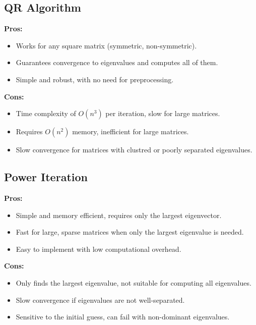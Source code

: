 \documentclass[journal]{IEEEtran}
\begin{document}
\subsection*{QR Algorithm}
\textbf{Pros:}
\begin{itemize}
    \item Works for any square matrix (symmetric, non-symmetric).
    \item Guarantees convergence to eigenvalues and computes all of them.
    \item Simple and robust, with no need for preprocessing.
\end{itemize}
\textbf{Cons:}
\begin{itemize}
    \item Time complexity of $O(n^3)$ per iteration, slow for large matrices.
    \item Requires $O(n^2)$ memory, inefficient for large matrices.
    \item Slow convergence for matrices with clustred or poorly separated eigenvalues.
\end{itemize}

\subsection*{Power Iteration}
\textbf{Pros:}
\begin{itemize}
    \item Simple and memory efficient, requires only the largest eigenvector.
    \item Fast for large, sparse matrices when only the largest eigenvalue is needed.
    \item Easy to implement with low computational overhead.
\end{itemize}
\textbf{Cons:}
\begin{itemize}
    \item Only finds the largest eigenvalue, not suitable for computing all eigenvalues.
    \item Slow convergence if eigenvalues are not well-separated.
    \item Sensitive to the initial guess, can fail with non-dominant eigenvalues.
\end{itemize}
\end{document}
